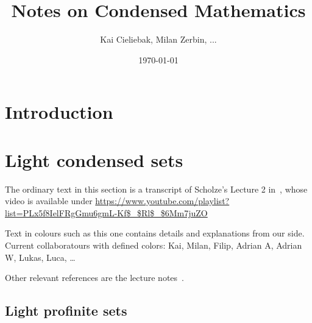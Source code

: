 \documentclass{notes}
\begin{document}
\title{Notes on Condensed Mathematics} 
\author{Kai Cieliebak, Milan Zerbin, ...}
\date{\today}



\maketitle


\section{Introduction}\label{sec:intro}

\section{Light condensed sets}\label{sec:light-condensed-sets}

The ordinary text in this section is a transcript of Scholze's Lecture
2 in~\cite{videos}, whose video is available under
\url{https://www.youtube.com/playlist?list=PLx5f8IelFRgGmu6gmL-Kf$\_$Rl$\_$6Mm7juZO}

Text in colours such as {\kai this one} contains details and
explanations from our side.
Current collaboratours with defined colors:
{\kai Kai}, %
{\milan Milan}, %
{\filip Filip}, %
{\sadrian Adrian A}, %
{\adrian Adrian W}, %
{\lukas Lukas},
{\luca Luca}, %
\dots

Other relevant references are the lecture
notes~\cite{analytic,condensed,complex}. 

\subsection{Light profinite sets}
\end{document}
